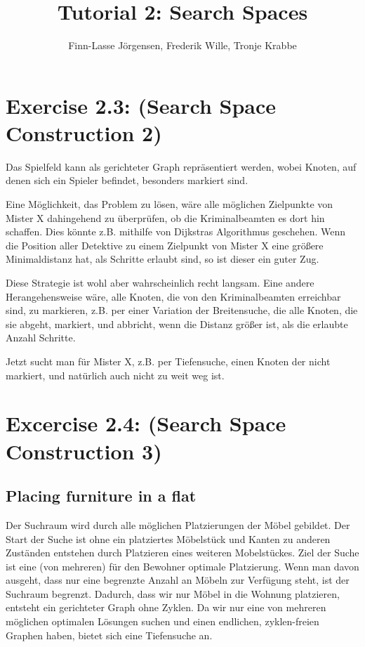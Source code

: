\documentclass[12pt,a4paper]{article}
\author{Finn-Lasse Jörgensen, Frederik Wille, Tronje Krabbe}
\title{Tutorial 2: Search Spaces}
\begin{document}
\maketitle


\section*{Exercise 2.3: (Search Space Construction 2)} %
Das Spielfeld kann als gerichteter Graph repräsentiert werden,
wobei Knoten, auf denen sich ein Spieler befindet, besonders
markiert sind.

Eine Möglichkeit, das Problem zu lösen, wäre alle möglichen Zielpunkte
von Mister X dahingehend zu überprüfen, ob die Kriminalbeamten
es dort hin schaffen. Dies könnte z.B. mithilfe von Dijkstras
Algorithmus geschehen. Wenn die Position aller Detektive zu einem
Zielpunkt von Mister X eine größere Minimaldistanz hat,
als Schritte erlaubt sind, so ist dieser ein guter Zug.

Diese Strategie ist wohl aber wahrscheinlich recht langsam.
Eine andere Herangehensweise wäre, alle Knoten, die von
den Kriminalbeamten erreichbar sind, zu markieren, z.B.
per einer Variation der Breitensuche, die alle Knoten, die sie abgeht,
markiert, und abbricht, wenn die Distanz größer ist, als
die erlaubte Anzahl Schritte.

Jetzt sucht man für Mister X, z.B. per Tiefensuche,
einen Knoten der nicht markiert, und natürlich auch nicht zu
weit weg ist.

\section*{Excercise 2.4: (Search Space Construction 3)}
\subsection*{Placing furniture in a flat}
Der Suchraum wird durch alle möglichen Platzierungen der Möbel gebildet.
Der Start der Suche ist ohne ein platziertes Möbelstück und Kanten zu
anderen Zuständen entstehen durch Platzieren eines weiteren Mobelstückes.
Ziel der Suche ist eine (von mehreren) für den Bewohner optimale Platzierung.
Wenn man davon ausgeht, dass nur eine begrenzte Anzahl an Möbeln
zur Verfügung steht, ist der Suchraum begrenzt. Dadurch, dass wir
nur Möbel in die Wohnung platzieren, entsteht ein gerichteter Graph ohne Zyklen.
Da wir nur eine von mehreren möglichen optimalen Lösungen suchen
und einen endlichen, zyklen-freien Graphen haben, bietet sich eine Tiefensuche an.
\end{document}
